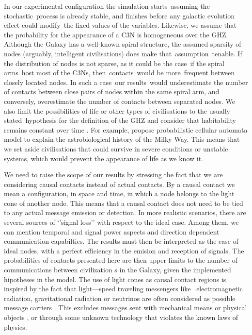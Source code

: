 \documentclass[crop]{CSLB}
\newcommand{\ceti}{C3N}
\newcommand{\cetis}{C3Ns}
\begin{document}
In our experimental configuration the simulation starts assuming the stochastic process is already stable, and finishes before any galactic evolution effect could modify the fixed values of the variables.
%
Likewise, we assume that the probability for the appearance of a \ceti{} is homogeneous over the GHZ.
%
Although the Galaxy has a well-known spiral structure, the assumed sparsity of nodes (arguably, intelligent civilisations) does make that assumption tenable.
%
If the distribution of nodes is not sparse, as it could be the case if the spiral arms host most of the \cetis{}, then contacts would be more frequent between closely located nodes.
%
In such a case our results would underestimate the number of contacts between close pairs of nodes within the same spiral arm, and conversely, overestimate the number of contacts between separated nodes.
%
We also limit the possibilities of life or other types of civilisations to the usually stated hypothesis for the definition of
the GHZ \citep{dayal_habitability_2016, gonzalez_galactic_2001, lineweaver_galactic_2004, gonzalez_habitable_2005,
morrison_extending_2015, haqq-misra_evolution_2019, rahvar_cosmic_2016, gobat_evolution_2016, rahvar_cosmic_2016} and consider that habitability remains constant over time \citep[see, however, ][]{gonzalez_habitable_2005, dayal_habitability_2016, gobat_evolution_2016}.
%
For example, \citet{vukotic_astrobiological_2012} propose
probabilistic cellular automata model to explain the astrobiological
history of the Milky Way. %
%
This means that we set aside civilisations that could survive in severe conditions or unstable systems, which would prevent the appearance of life as we know it.  



We need to raise the scope of our results by stressing the fact that we are considering causal contacts instead of actual contacts.
%
By a causal contact we mean a configuration, in space and time, in which a node belongs to the light cone of another node.
%
This means that a causal contact does not need to be tied to any actual message emission or detection.
%
In more realistic scenarios, there are several sources of ‘’signal loss’’ with respect to the ideal case.
%
Among them, we can mention temporal and signal power aspects and direction dependent communication capabilties.
%
The results must then be interpreted as the case of ideal nodes, with a perfect efficiency in the emision and reception of signals.
%
The probabilities of contacts presented here are then upper limits to the number of communications between civilization s in the Galaxy, given the implemented hipotheses in the model.
%
The use of light cones as causal contact regions is inspired by the fact that light—speed traveling messengers like 
electromagnetic radiation, gravitational radiation or neutrinos are often considered as possible message carriers \citep{hippke_interstellar_2017, wright_how_2018}.
%
This excludes messages sent with mechanical means or physical objects \citep[e.g., ][]{Armstrong2013, barlow_galactic_2013}, or through some unknown technology that violates the known laws of physics.
\end{document}
